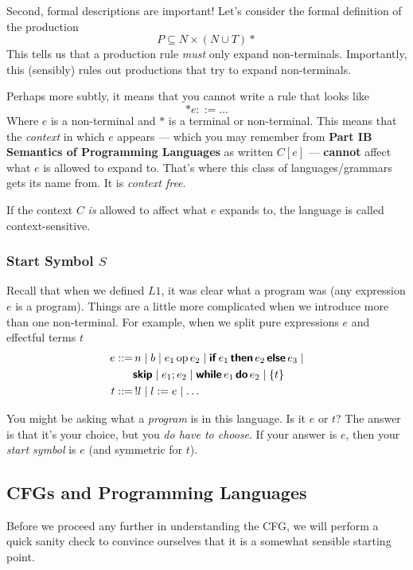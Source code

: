 Second, formal descriptions are important! Let's consider the formal definition of the production
\[P \subseteq N \times (N \cup T)*\]
This tells us that a production rule \textit{must} only expand non-terminals. Importantly, this (sensibly) rules out productions that try to expand non-terminals.

Perhaps more subtly, it means that you cannot write a rule that looks like 
\[*e ::= \ldots\]
Where $e$ is a non-terminal and $*$ is a terminal or non-terminal. This means that the \textit{context} in which $e$ appears --- which you may remember from \textbf\textsf{Part IB Semantics of Programming Languages} as written $C[e]$ --- \textbf{cannot} affect what $e$ is allowed to expand to. That's where this class of languages/grammars gets its name from. It is \textit{context free}. 

If the context $C$ \textit{is} allowed to affect what $e$ expands to, the language is called context-sensitive. 

\subsubsection{Start Symbol $S$}
Recall that when we defined $L1$, it was clear what a program was (any expression $e$ is a program). Things are a little more complicated when we introduce more than one non-terminal. For example, when we split pure expressions $e$ and effectful terms $t$
\begin{align*}
    e ::=& \, n \mid b \mid e_1 \, \text{op} \, e_2 \mid \textbf{\textsf{if}} \, e_1 \, \textbf{\textsf{then}} \, e_2 \, \textbf{\textsf{else}} \, e_3 \mid \\
    & \textbf{\textsf{skip}} \mid e_1 ; e_2 \mid \textbf{\textsf{while}} \, e_1 \, \textbf{\textsf{do}} \, e_2 \mid \{ t \} \\
    t ::= & \, !l \mid l := e \mid \ldots
\end{align*}

You might be asking what a \textit{program} is in this language. Is it $e$ or $t$? The answer is that it's your choice, but you \textit{do have to choose}. If your answer is $e$, then your \textit{start symbol} is $e$ (and symmetric for $t$).

\subsection{CFGs and Programming Languages}\label{section:cfg-and-pl}
Before we proceed any further in understanding the CFG, we will perform a quick sanity check to convince ourselves that it is a somewhat sensible starting point. 

